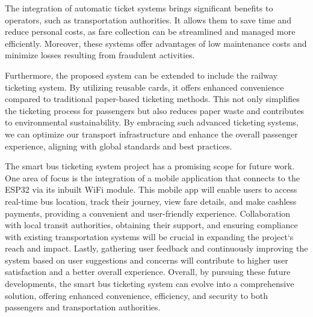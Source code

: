\documentclass[conference]{IEEEtran}
\begin{document}
The integration of automatic ticket systems brings significant benefits to operators, such as transportation authorities. It allows them to save time and reduce personal costs, as fare collection can be streamlined and managed more efficiently. Moreover, these systems offer advantages of low maintenance costs and minimize losses resulting from fraudulent activities.

Furthermore, the proposed system can be extended to include the railway ticketing system. By utilizing reusable cards, it offers enhanced convenience compared to traditional paper-based ticketing methods. This not only simplifies the ticketing process for passengers but also reduces paper waste and contributes to environmental sustainability. By embracing such advanced ticketing systems, we can optimize our transport infrastructure and enhance the overall passenger experience, aligning with global standards and best practices.

The smart bus ticketing system project has a promising scope for future work. One area of focus is the integration of a mobile application that connects to the ESP32 via its inbuilt WiFi module. This mobile app will enable users to access real-time bus location, track their journey, view fare details, and make cashless payments, providing a convenient and user-friendly experience.
Collaboration with local transit authorities, obtaining their support, and ensuring compliance with existing transportation systems will be crucial in expanding the project`s reach and impact. Lastly, gathering user feedback and continuously improving the system based on user suggestions and concerns will contribute to higher user satisfaction and a better overall experience.
Overall, by pursuing these future developments, the smart bus ticketing system can evolve into a comprehensive solution, offering enhanced convenience, efficiency, and security to both passengers and transportation authorities.
\end{document}
